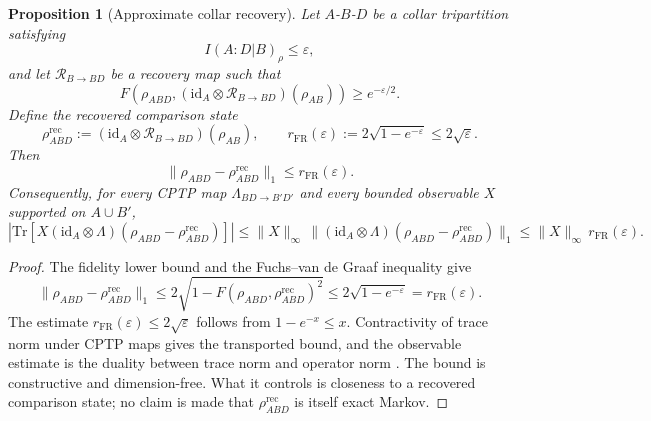 \documentclass[11pt]{article}
\newtheorem{proposition}[theorem]{Proposition}
\begin{document}
\begin{proposition}[Approximate collar recovery]\label{prop:approxrecover}
Let \(A\)-\(B\)-\(D\) be a collar tripartition satisfying
\[
I(A:D|B)_\rho\le \varepsilon,
\]
and let $\mathcal R_{B\to BD}$ be a recovery map such that
\[
F\!\left(\rho_{ABD},(\mathrm{id}_A\otimes \mathcal R_{B\to BD})(\rho_{AB})\right)\ge e^{-\varepsilon/2}.
\]
Define the recovered comparison state
\[
\rho^{\mathrm{rec}}_{ABD}:=(\mathrm{id}_A\otimes \mathcal R_{B\to BD})(\rho_{AB}),
\qquad
r_{\mathrm{FR}}(\varepsilon):=2\sqrt{1-e^{-\varepsilon}}\le 2\sqrt{\varepsilon}.
\]
Then
\[
\|\rho_{ABD}-\rho^{\mathrm{rec}}_{ABD}\|_1\le r_{\mathrm{FR}}(\varepsilon).
\]
Consequently, for every CPTP map \(\Lambda_{BD\to B'D'}\) and every bounded observable \(X\) supported on \(A\cup B'\),
\[
\left|\mathrm{Tr}\!\left[X(\mathrm{id}_A\otimes \Lambda)(\rho_{ABD}-\rho^{\mathrm{rec}}_{ABD})\right]\right|
\le
\|X\|_\infty\,\|(\mathrm{id}_A\otimes \Lambda)(\rho_{ABD}-\rho^{\mathrm{rec}}_{ABD})\|_1
\le
\|X\|_\infty\,r_{\mathrm{FR}}(\varepsilon).
\]
\end{proposition}

\begin{proof}
The fidelity lower bound and the Fuchs--van de Graaf inequality give
\[
\|\rho_{ABD}-\rho^{\mathrm{rec}}_{ABD}\|_1
\le
2\sqrt{1-F(\rho_{ABD},\rho^{\mathrm{rec}}_{ABD})^2}
\le
2\sqrt{1-e^{-\varepsilon}}
=
r_{\mathrm{FR}}(\varepsilon).
\]
The estimate \(r_{\mathrm{FR}}(\varepsilon)\le 2\sqrt{\varepsilon}\) follows from \(1-e^{-x}\le x\). Contractivity of trace norm under CPTP maps gives the transported bound, and the observable estimate is the duality between trace norm and operator norm \cite{FawziRenner}. The bound is constructive and dimension-free. What it controls is closeness to a recovered comparison state; no claim is made that \(\rho^{\mathrm{rec}}_{ABD}\) is itself exact Markov.
\end{proof}
\end{document}
